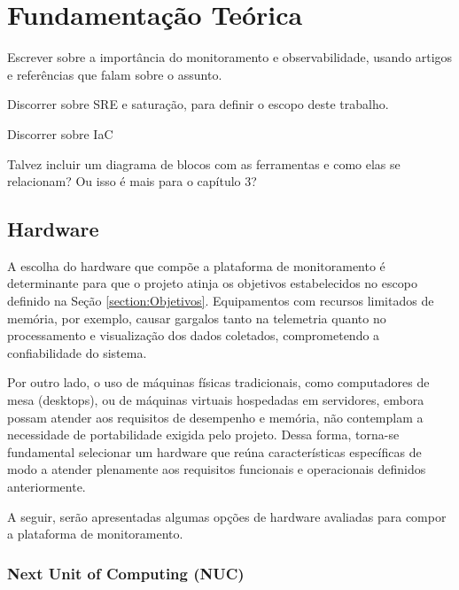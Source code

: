 \chapter{Fundamentação Teórica}
\label{chap2}





Escrever sobre a importância do monitoramento e observabilidade, usando artigos e referências que falam sobre o assunto.

Discorrer sobre SRE e saturação, para definir o escopo deste trabalho.

Discorrer sobre IaC

Talvez incluir um diagrama de blocos com as ferramentas e como elas se relacionam? Ou isso é mais para o capítulo 3?

\section{Hardware}
A escolha do hardware que compõe a plataforma de monitoramento é determinante para que o projeto atinja os objetivos estabelecidos no escopo definido na Seção \ref{section:Objetivos}. Equipamentos com recursos limitados de memória, por exemplo, causar gargalos tanto na telemetria quanto no processamento e visualização dos dados coletados, comprometendo a confiabilidade do sistema.

Por outro lado, o uso de máquinas físicas tradicionais, como computadores de mesa (desktops), ou de máquinas virtuais hospedadas em servidores, embora possam atender aos requisitos de desempenho e memória, não contemplam a necessidade de portabilidade exigida pelo projeto. Dessa forma, torna-se fundamental selecionar um hardware que reúna características específicas de modo a atender plenamente aos requisitos funcionais e operacionais definidos anteriormente.

A seguir, serão apresentadas algumas opções de hardware avaliadas para compor a plataforma de monitoramento.

\subsection{Next Unit of Computing (NUC)}

